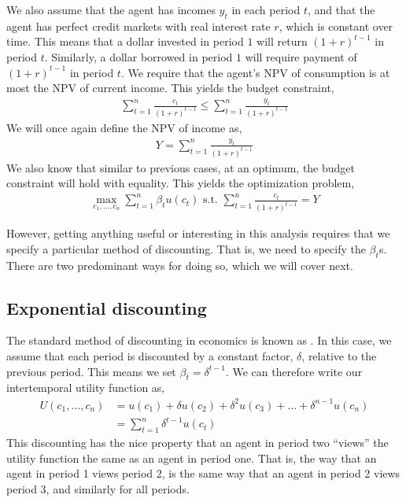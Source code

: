 We also assume that the agent has incomes $y_t$ in each period $t$, and that the agent has perfect credit markets with real interest rate $r$, which is constant over time. This means that a dollar invested in period $1$ will return $(1 + r)^{t - 1}$ in period $t$. Similarly, a dollar borrowed in period $1$ will require payment of $(1 + r)^{t - 1}$ in period $t$. We require that the agent's NPV of consumption is at most the NPV of current income. This yields the budget constraint,
\begin{align*}
    \sum_{t = 1}^n \frac{c_t}{(1 + r)^{t - 1}} \leq \sum_{t = 1}^n \frac{y_t}{(1 + r)^{t - 1}}
\end{align*}
We will once again define the NPV of income as,
\begin{align*}
    Y = \sum_{t = 1}^n \frac{y_t}{(1 + r)^{t - 1}}
\end{align*}
We also know that similar to previous cases, at an optimum, the budget constraint will hold with equality. This yields the optimization problem,
\begin{align*}
    \max_{c_1, \dots, c_n} \sum_{t = 1}^n \beta_t u(c_t) \text{ s.t. } \sum_{t = 1}^n \frac{c_t}{(1 + r)^{t - 1}} = Y
\end{align*}

However, getting anything useful or interesting in this analysis requires that we specify a particular method of discounting. That is, we need to specify the $\beta_t$s. There are two predominant ways for doing so, which we will cover next. 

\subsection*{Exponential discounting}
The standard method of discounting in economics is known as . In this case, we assume that each period is discounted by a constant factor, $\delta$, relative to the previous period. This means we set $\beta_t = \delta^{t - 1}$. We can therefore write our intertemporal utility function as,
\begin{align*}
    U(c_1, \dots, c_n) &= u(c_1) + \delta u(c_2) + \delta^2 u(c_3) + \dots + \delta^{n - 1} u(c_n) \\
    &= \sum_{t = 1}^n \delta^{t - 1}u(c_t)
\end{align*}
This discounting has the nice property that an agent in period two ``views'' the utility function the same as an agent in period one. That is, the way that an agent in period 1 views period 2, is the same way that an agent in period 2 views period 3, and similarly for all periods. 


